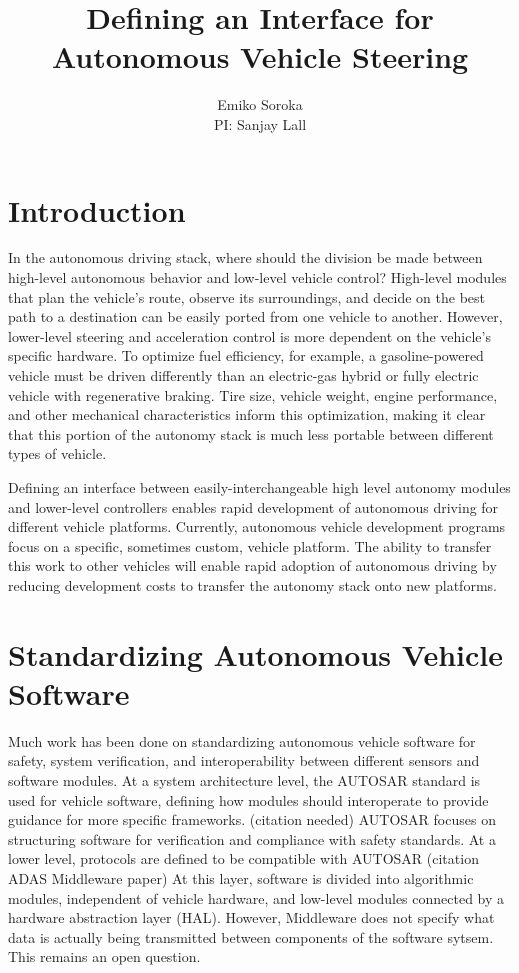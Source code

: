 \documentclass{article}
\author{Emiko Soroka\\PI: Sanjay Lall}
\title{Defining an Interface for Autonomous Vehicle Steering}
\begin{document}
\maketitle


\section*{Introduction}
In the autonomous driving stack, where should the division be made between high-level autonomous behavior and low-level vehicle control? High-level modules that plan the vehicle's route, observe its surroundings, and decide on the best path to a destination can be easily ported from one vehicle to another. However, lower-level steering and acceleration control is more dependent on the vehicle's specific hardware. To optimize fuel efficiency, for example, a gasoline-powered vehicle must be driven differently than an electric-gas hybrid or fully electric vehicle with regenerative braking. Tire size, vehicle weight, engine performance, and other mechanical characteristics inform this optimization, making it clear that this portion of the autonomy stack is much less portable between different types of vehicle.

Defining an interface between easily-interchangeable high level autonomy modules and lower-level controllers enables rapid development of autonomous driving for different vehicle platforms. Currently, autonomous vehicle development programs focus on a specific, sometimes custom, vehicle platform. The ability to transfer this work to other vehicles will enable rapid adoption of autonomous driving by reducing development costs to transfer the autonomy stack onto new platforms.

\section*{Standardizing Autonomous Vehicle Software}
Much work has been done on standardizing autonomous vehicle software for safety, system verification, and interoperability between different sensors and software modules. 
At a system architecture level, the AUTOSAR standard is used for vehicle software, defining how modules should interoperate to provide guidance for more specific frameworks. (citation needed) AUTOSAR focuses on structuring software for verification and compliance with safety standards.
At a lower level, protocols are defined to be compatible with AUTOSAR (citation ADAS Middleware paper)
At this layer, software is divided into algorithmic modules, independent of vehicle hardware, and low-level modules connected by a hardware abstraction layer (HAL). However, Middleware does not specify what data is actually being transmitted between components of the software sytsem. This remains an open question.
\end{document}
